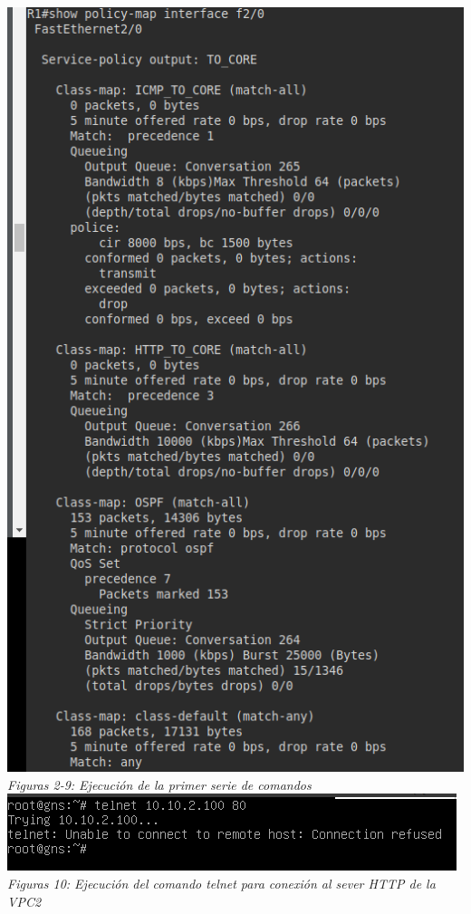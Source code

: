 \documentclass[10pt]{article}
\begin{document}
\begin{center}
  \includegraphics[scale=0.5]{imgs/9.png}
  \\\textit{Figuras 2-9: Ejecución de la primer serie de comandos}\\
  \includegraphics[scale=0.5]{imgs/10.png}
  \\\textit{Figuras 10: Ejecución del comando telnet para conexión al sever HTTP de la VPC2}\\

\end{center}
\end{document}
